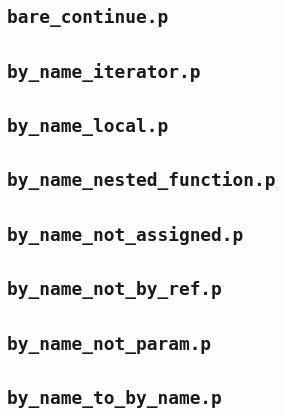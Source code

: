 \documentclass[a4paper,10pt]{article}
\begin{document}
\begin{multicols}{2}

\subsection{\textbf{\texttt{bare\_continue.p}}}


\subsection{\textbf{\texttt{by\_name\_iterator.p}}}


\subsection{\textbf{\texttt{by\_name\_local.p}}}


\subsection{\textbf{\texttt{by\_name\_nested\_function.p}}}


\subsection{\textbf{\texttt{by\_name\_not\_assigned.p}}}


\subsection{\textbf{\texttt{by\_name\_not\_by\_ref.p}}}


\subsection{\textbf{\texttt{by\_name\_not\_param.p}}}


\subsection{\textbf{\texttt{by\_name\_to\_by\_name.p}}}



\end{multicols}
\end{document}
